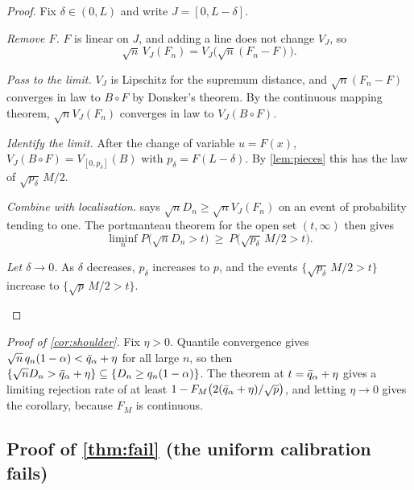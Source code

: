 \begin{proof}
Fix $\delta\in(0,L)$ and write $J=[0,L-\delta]$.
\begin{steps}
\item \emph{Remove $F$.} $F$ is linear on $J$, and adding a line does not change $V_J$, so
\[
\sqrt n\,V_J(F_n)=V_J\bigl(\sqrt n(F_n-F)\bigr).
\]
\item \emph{Pass to the limit.} $V_J$ is Lipschitz for the supremum distance, and $\sqrt n(F_n-F)$ converges in law to $B\circ F$ by Donsker's theorem. By the continuous mapping theorem, $\sqrt nV_J(F_n)$ converges in law to $V_J(B\circ F)$.
\item \emph{Identify the limit.} After the change of variable $u=F(x)$, $V_J(B\circ F)=V_{[0,p_\delta]}(B)$ with $p_\delta=F(L-\delta)$. By \cref{lem:pieces} this has the law of $\sqrt{p_\delta}\,M/2$.
\item \emph{Combine with localisation.}  says $\sqrt nD_n\ge\sqrt nV_J(F_n)$ on an event of probability tending to one. The portmanteau theorem for the open set $(t,\infty)$ then gives
\[
\liminf_n P\bigl(\sqrt nD_n>t\bigr)\ \ge\ P\bigl(\sqrt{p_\delta}\,M/2>t\bigr).
\]
\item \emph{Let $\delta\to0$.} As $\delta$ decreases, $p_\delta$ increases to $p$, and the events $\{\sqrt{p_\delta}\,M/2>t\}$ increase to $\{\sqrt p\,M/2>t\}$.\qedhere
\end{steps}
\end{proof}

\emph{Proof of \cref{cor:shoulder}.} Fix $\eta>0$. Quantile convergence gives $\sqrt n\,q_n(1-\alpha)<\bar q_\alpha+\eta$ for all large $n$, so then $\{\sqrt nD_n>\bar q_\alpha+\eta\}\subseteq\{D_n\ge q_n(1-\alpha)\}$. The theorem at $t=\bar q_\alpha+\eta$ gives a limiting rejection rate of at least $1-F_M\bigl(2(\bar q_\alpha+\eta)/\sqrt p\bigr)$, and letting $\eta\to0$ gives the corollary, because $F_M$ is continuous.

\subsection{Proof of \cref{thm:fail} (the uniform calibration fails)}


